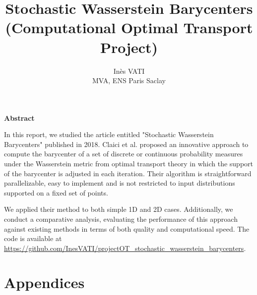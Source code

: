 \documentclass[a4paper, 11pt]{article}
\title{Stochastic Wasserstein Barycenters (Computational Optimal Transport Project)}
\author{Inès VATI \email{ines.vati@eleves.enpc.fr} \\ MVA, ENS Paris Saclay }
\begin{document}
\maketitle

\begin{center}
    \textbf{Abstract} \\
\end{center}

In this report, we studied the article \cite{claici_stochastic_2018} entitled "Stochastic Wasserstein Barycenters" published in 2018. Claici et al. proposed an innovative approach to compute the barycenter of a set of discrete or continuous probability measures under the Wasserstein metric from optimal transport theory in which the support of the barycenter is adjusted in each iteration. Their algorithm is straightforward parallelizable, easy to implement and is not restricted to input distributions supported on a fixed set of points. 


We applied their method to both simple 1D and 2D cases. Additionally, we conduct a comparative analysis, evaluating the performance of this approach against existing methods in terms of both quality and computational speed. The code is available at \url{https://github.com/InesVATI/projectOT_stochastic_wasserstein_barycenters}. 







 






\printbibliography

\newpage
\section*{Appendices}
\end{document}
